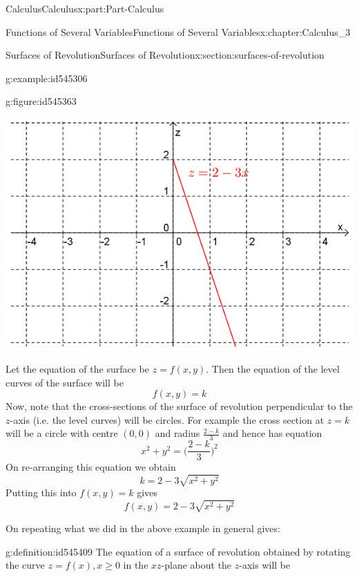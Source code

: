 \documentclass[oneside,10pt,]{book}
\numberwithin{equation}{section}
\begin{document}
\begin{partptx}{Calculus}{}{Calculus}{}{}{x:part:Part-Calculus}
\begin{chapterptx}{Functions of Several Variables}{}{Functions of Several Variables}{}{}{x:chapter:Calculus_3}
\begin{sectionptx}{Surfaces of Revolution}{}{Surfaces of Revolution}{}{}{x:section:surfaces-of-revolution}
\begin{example}{}{g:example:id545306}
\par\smallskip%
\noindent\hypertarget{g:solution:id545373}{}\begin{figureptx}{}{g:figure:id545363}{}%
\begin{image}{0.125}{0.75}{0.125}%
\includegraphics[width=\linewidth]{./Calculus/Images/3/3_example10.png}
\end{image}%
\tcblower
\end{figureptx}%
 Let the equation of the surface be \(z=f(x,y)\). Then the equation of the level curves of the surface will be%
\begin{equation*}
f(x,y)=k
\end{equation*}
Now, note that the cross-sections of the surface of revolution perpendicular to the \(z\)-axis (i.e. the level curves) will be circles. For example the cross section at \(z=k\) will be a circle with centre \((0,0)\) and radius \(\frac{2-k}{3}\) and hence has equation%
\begin{equation*}
x^2+y^2=\big(\frac{2-k}{3}\big)^2
\end{equation*}
On re-arranging this equation we obtain%
\begin{equation*}
k=2-3\sqrt{x^2+y^2}
\end{equation*}
Putting this into \(f(x,y)=k\) gives%
\begin{equation*}
f(x,y)=2-3\sqrt{x^2+y^2}
\end{equation*}
%
\end{example}
On repeating what we did in the above example in general gives: \begin{definition}{}{g:definition:id545409}%
The equation of a surface of revolution obtained by rotating the curve \(z=f(x), x\geq 0\) in the \(xz\)-plane about the \(z\)-axis will be%

\end{definition}
\end{sectionptx}
\end{chapterptx}
\end{partptx}
\end{document}
